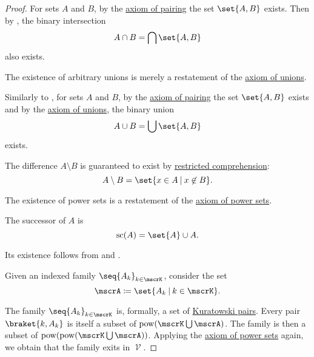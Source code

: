 \begin{proof}
   For sets \( A \) and \( B \), by the \hyperref[def:zfc/pairing]{axiom of pairing} the set \( \set{ A, B } \) exists. Then by , the binary intersection
  \begin{equation*}
    A \cap B = \bigcap \set{ A, B }
  \end{equation*}
  also exists.

   The existence of arbitrary unions is merely a restatement of the \hyperref[def:zfc/union]{axiom of unions}.

   Similarly to , for sets \( A \) and \( B \), by the \hyperref[def:zfc/pairing]{axiom of pairing} the set \( \set{ A, B } \) exists and by the \hyperref[def:zfc/union]{axiom of unions}, the binary union
  \begin{equation*}
    A \cup B = \bigcup \set{ A, B }
  \end{equation*}
  exists.

   The difference \( A \setminus B \) is guaranteed to exist by \hyperref[def:zfc/specification]{restricted comprehension}:
  \begin{equation*}
    A \setminus B = \set{ x \in A \given x \not\in B }.
  \end{equation*}

   The existence of power sets is a restatement of the \hyperref[def:zfc/power_set]{axiom of power sets}.

   The successor of \( A \) is
  \begin{equation*}
    \op{sc}(A) = \set{ A } \cup A.
  \end{equation*}

  Its existence follows from  and .

   Given an indexed family \( \seq{ A_k }_{k \in \mscrK} \), consider the set
  \begin{equation*}
    \mscrA \coloneqq \set{ A_k \given k \in \mscrK }.
  \end{equation*}

  The family \( \seq{ A_k }_{k \in \mscrK} \) is, formally, a set of \hyperref[def:kuratowski_pair]{Kuratowski pairs}. Every pair \( \braket{ k, A_k } \) is itself a subset of \( \pow(\mscrK \bigcup \mscrA) \). The family is then a subset of \( \pow(\pow(\mscrK \bigcup \mscrA)) \). Applying the \hyperref[def:zfc/power_set]{axiom of power sets} again, we obtain that the family exits in \( \mscrV \).


\end{proof}
